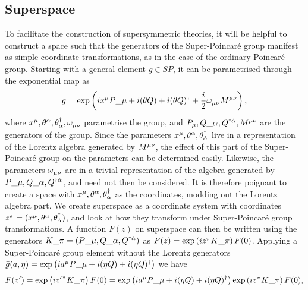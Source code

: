     \subsection{Superspace}
        To facilitate the construction of supersymmetric theories, it will be helpful to construct a space such that the generators of the Super-Poincaré group manifest as simple coordinate transformations, as in the case of the ordinary Poincaré group.
        Starting with a general element \(g \in SP\), it can be parametrised through the exponential map as
        \begin{equation}
            g = \exptext{ix\^{\mu} P\_{\mu} + i(\theta Q) + i (\theta Q)^\dagger + \frac{i}{2}\tensor{\omega}{_\mu_\nu}\tensor{M}{^\mu^\nu}},
        \end{equation}
        where \(x^\mu, \theta\^{\alpha}, \theta\indices*{^\dagger_{\dot\alpha}}, \tensor{\omega}{_\mu_\nu}\) parametrise the group, and \(P_\mu, Q\_{\alpha}, Q\indices*{^\dagger^{\dot\alpha}}, \tensor{M}{^\mu^\nu}\) are the generators of the group.
        Since the parameters \(x\^{\mu}, \theta\^{\alpha}, \theta\indices*{^\dagger_{\dot\alpha}}\) live in a representation of the Lorentz algebra generated by \(\tensor{M}{^\mu^\nu}\), the effect of this part of the Super-Poincaré group on the parameters can be determined easily.
        Likewise, the parameters \(\tensor{\omega}{_\mu_\nu}\) are in a trivial representation of the algebra generated by \(P\_{\mu}, Q\_{\alpha}, Q\indices*{^\dagger^{\dot\alpha}}\), and need not then be considered.
        It is therefore poignant to create a space with \(x\^{\mu}, \theta\^{\alpha}, \theta\indices*{^\dagger_{\dot\alpha}}\) as the coordinates, modding out the Lorentz algebra part.
        We create superspace as a coordinate system with coordinates \(z\^{\pi} = (x\^{\mu}, \theta\^{\alpha}, \theta\indices*{^\dagger_{\dot\alpha}})\), and look at how they transform under Super-Poincaré group transformations.
        A function \(F(z)\) on superspace can then be written using the generators \(K\_\pi = (P\_\mu, Q\_\alpha, Q\indices*{^\dagger^{\dot\alpha}})\) as \(F(z) = \exptext{iz\^\pi K\_\pi} F(0)\).
        Applying a Super-Poincaré group element without the Lorentz generators \(\bar{g}(a, \eta) = \exptext{ia\^\mu P\_\mu + i (\eta Q) + i (\eta Q)^\dagger}\) we have
        \begin{equation}
            F(z^\prime) = \exptext{i{z^\prime}\^\pi K\_\pi} F(0) = \exptext{ia\^\mu P\_\mu + i (\eta Q) + i (\eta Q)^\dagger} \exptext{iz\^\pi K\_\pi} F(0),
        \end{equation}
